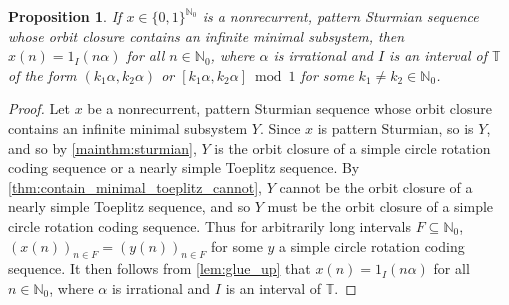 \documentclass[11pt,reqno]{amsart}
\newtheorem{proposition}[theorem]{Proposition}
\theoremstyle{definition}
\theoremstyle{plain}
\newcommand{\N}{\mathbb{N}}
\newcommand{\T}{\mathbb{T}}
\newcommand{\AuthornoteR}[2]{{\sf\small\color{blue}{[#1: #2]}}}
\newcommand{\AuthornoteC}[2]{{\sf\small\color{cyan}{[#1: #2]}}}
\newcommand{\rp}{\AuthornoteR{R}}
\newcommand{\Cnote}{\AuthornoteC{C}}
\begin{document}
\begin{proposition}\label{prop:nonrecurrent_pattern_Sturmian}
If $x \in \{0, 1\}^{\N_0}$ is a nonrecurrent, pattern Sturmian sequence whose orbit closure contains an infinite minimal subsystem, then $x(n) = 1_{I}(n \alpha)$ for all $n \in \N_0$, where $\alpha$ is irrational and $I$ is an interval of $\T$ of the form $(k_1 \alpha, k_2 \alpha)$ or $[k_1 \alpha, k_2 \alpha] \bmod 1$ for some $k_1 \neq k_2 \in \N_0$.
\end{proposition}
\begin{proof}


Let $x$ be a nonrecurrent, pattern Sturmian sequence whose orbit closure contains an infinite minimal subsystem $Y$.  Since $x$ is pattern Sturmian, so is $Y$, and so by \cref{mainthm:sturmian}, $Y$ is the orbit closure of a simple circle rotation coding sequence or a nearly simple Toeplitz sequence. By \cref{thm:contain_minimal_toeplitz_cannot}, $Y$ cannot be the orbit closure of a nearly simple Toeplitz sequence, and so $Y$ must be the orbit closure of a simple circle rotation coding sequence. Thus for arbitrarily long intervals $F \subseteq \N_0$, $(x(n))_{n \in F} = (y(n))_{n \in F}$ for some $y$ a simple circle rotation coding sequence.  It then follows from \cref{lem:glue_up} that $x(n) = 1_{I}(n \alpha)$ for all $n \in \N_0$, where $\alpha$ is irrational and $I$ is an interval of $\T$. 


\end{proof}
\end{document}
